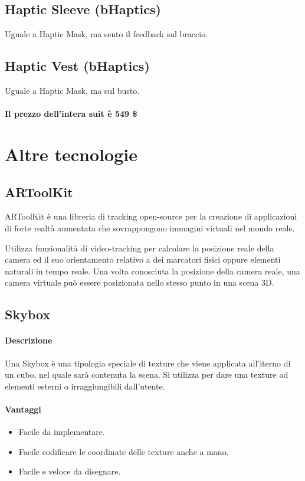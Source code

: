 \documentclass[8pt]{extarticle}
\begin{document}
\begin{multicols}{3}
\subsection{Haptic Sleeve (bHaptics)}
Uguale a Haptic Mask, ma sento il feedback sul braccio.
\subsection{Haptic Vest (bHaptics)}
Uguale a Haptic Mask, ma sul busto.
\paragraph{Il prezzo dell'intera suit è 549 \$} 
\section{Altre tecnologie}
\subsection{ARToolKit}
ARToolKit è una libreria di tracking open-source per la creazione di applicazioni di forte realtà
aumentata che sovrappongono immagini virtuali nel mondo reale.

Utilizza funzionalità di video-tracking per calcolare la posizione reale della camera ed il suo
orientamento relativo a dei marcatori fisici oppure elementi naturali in tempo reale.
Una volta conosciuta la posizione della camera reale, una camera virtuale può essere posizionata
nello stesso punto in una scena 3D.

\subsection{Skybox}
\paragraph{Descrizione} 
Una Skybox è una tipologia speciale di texture che viene applicata all'iterno di un 
cubo, nel quale sarà contenuta la scena. Si utilizza per dare una texture ad elementi
esterni o irraggiungibili dall'utente. 
\paragraph{Vantaggi}
\begin{itemize}
    \item Facile da implementare.
    \item Facile codificare le coordinate delle texture anche a mano.
    \item Facile e veloce da disegnare.
\end{itemize}

\end{multicols}
\end{document}
